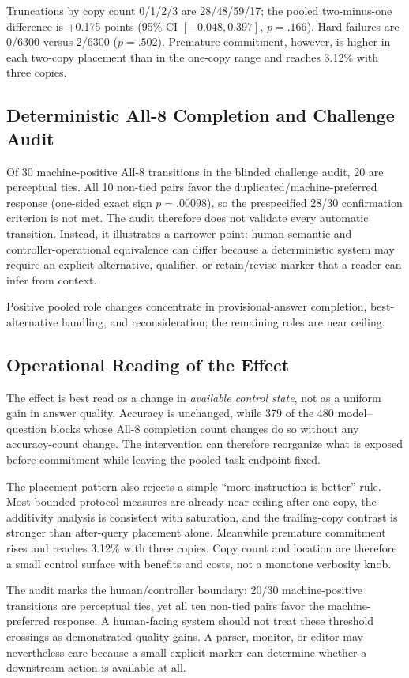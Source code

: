 \documentclass[10pt]{article}
\begin{document}
Truncations by copy count 0/1/2/3 are 28/48/59/17; the pooled two-minus-one difference is +0.175 points (95\% CI $[-0.048,0.397]$, $p=.166$). Hard failures are 0/6300 versus 2/6300 ($p=.502$). Premature commitment, however, is higher in each two-copy placement than in the one-copy range and reaches 3.12\% with three copies.

\subsection{Deterministic All-8 Completion and Challenge Audit}
Of 30 machine-positive All-8 transitions in the blinded challenge audit, 20 are perceptual ties. All 10 non-tied pairs favor the duplicated/machine-preferred response (one-sided exact sign $p=.00098$), so the prespecified 28/30 confirmation criterion is not met. The audit therefore does not validate every automatic transition. Instead, it illustrates a narrower point: human-semantic and controller-operational equivalence can differ because a deterministic system may require an explicit alternative, qualifier, or retain/revise marker that a reader can infer from context.

Positive pooled role changes concentrate in provisional-answer completion, best-alternative handling, and reconsideration; the remaining roles are near ceiling.

\subsection{Operational Reading of the Effect}
The effect is best read as a change in \emph{available control state}, not as a uniform gain in answer quality. Accuracy is unchanged, while 379 of the 480 model--question blocks whose All-8 completion count changes do so without any accuracy-count change. The intervention can therefore reorganize what is exposed before commitment while leaving the pooled task endpoint fixed.

The placement pattern also rejects a simple ``more instruction is better'' rule. Most bounded protocol measures are already near ceiling after one copy, the additivity analysis is consistent with saturation, and the trailing-copy contrast is stronger than after-query placement alone. Meanwhile premature commitment rises and reaches 3.12\% with three copies. Copy count and location are therefore a small control surface with benefits and costs, not a monotone verbosity knob.

The audit marks the human/controller boundary: 20/30 machine-positive transitions are perceptual ties, yet all ten non-tied pairs favor the machine-preferred response. A human-facing system should not treat these threshold crossings as demonstrated quality gains. A parser, monitor, or editor may nevertheless care because a small explicit marker can determine whether a downstream action is available at all.
\end{document}
